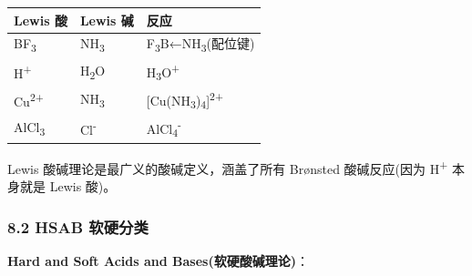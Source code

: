 \documentclass[a4paper,11pt]{ctexart}
\newcounter{none}
\begin{document}
{\def\LTcaptype{none} %
\begin{longtable}[]{@{}lll@{}}
\toprule\noalign{}
Lewis 酸 & Lewis 碱 & 反应 \\
\midrule\noalign{}
\endhead
\bottomrule\noalign{}
\endlastfoot
BF\textsubscript{3} & NH\textsubscript{3} & F\textsubscript{3}B←NH\textsubscript{3}(配位键) \\
H\textsuperscript{+} & H\textsubscript{2}O & H\textsubscript{3}O\textsuperscript{+} \\
Cu\textsuperscript{2+} & NH\textsubscript{3} & {[}Cu(NH\textsubscript{3})\textsubscript{4}{]}\textsuperscript{2+} \\
AlCl\textsubscript{3} & Cl\textsuperscript{-} & AlCl\textsubscript{4}\textsuperscript{-} \\
\end{longtable}
}

Lewis 酸碱理论是最广义的酸碱定义，涵盖了所有 Brønsted 酸碱反应(因为 H\textsuperscript{+} 本身就是 Lewis 酸)。

\subsubsection{8.2 HSAB 软硬分类}\label{hsab-ux8f6fux786cux5206ux7c7b}

\textbf{Hard and Soft Acids and Bases(软硬酸碱理论)}：
\end{document}
